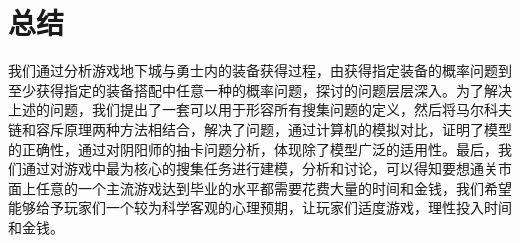 \documentclass[10pt,journal,compsoc]{IEEEtran}
\begin{document}
\section{总结}
我们通过分析游戏地下城与勇士内的装备获得过程，由获得指定装备的概率问题到至少获得指定的装备搭配中任意一种的概率问题，探讨的问题层层深入。为了解决上述的问题，我们提出了一套可以用于形容所有搜集问题的定义，然后将马尔科夫链和容斥原理两种方法相结合，解决了问题，通过计算机的模拟对比，证明了模型的正确性，通过对阴阳师的抽卡问题分析，体现除了模型广泛的适用性。最后，我们通过对游戏中最为核心的搜集任务进行建模，分析和讨论，可以得知要想通关市面上任意的一个主流游戏达到毕业的水平都需要花费大量的时间和金钱，我们希望能够给予玩家们一个较为科学客观的心理预期，让玩家们适度游戏，理性投入时间和金钱。




\end{document}
